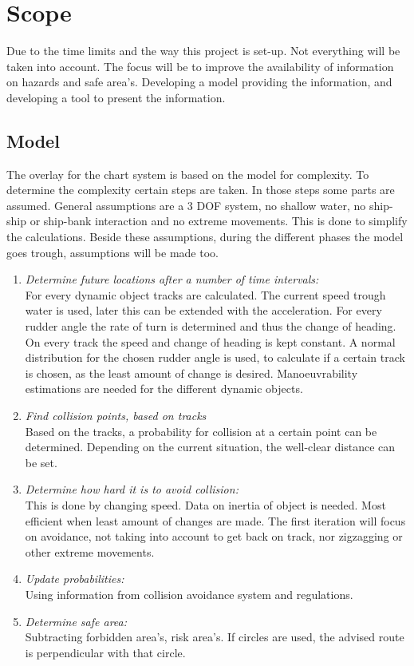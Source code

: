 
\section{Scope}
Due to the time limits and the way this project is set-up. Not everything will be taken into account. The focus will be to improve the availability of information on hazards and safe area's. Developing a model providing the information, and developing a tool to present the information. 

\subsection{Model}
The overlay for the chart system is based on the model for complexity. To determine the complexity certain steps are taken. In those steps some parts are assumed. General assumptions are a 3 \ac{DOF} system, no shallow water, no ship-ship or ship-bank interaction and no extreme movements. This is done to simplify the calculations. Beside these assumptions, during the different phases the model goes trough, assumptions will be made too. 
\begin{enumerate}
	\item \emph{Determine future locations after a number of time intervals:}\\
	For every dynamic object tracks are calculated. The current speed trough water is used, later this can be extended with the acceleration. For every rudder angle the rate of turn is determined and thus the change of heading. On every track the speed and change of heading is kept constant. A normal distribution for the chosen rudder angle is used, to calculate if a certain track is chosen, as the least amount of change is desired. Manoeuvrability estimations are needed for the different dynamic objects.
	\item \emph{Find collision points, based on tracks}\\
	Based on the tracks, a probability for collision at a certain point can be determined. Depending on the current situation, the well-clear distance can be set.
	\item \emph{Determine how hard it is to avoid collision:}\\
	This is done by changing speed. Data on inertia of object is needed. Most efficient when least amount of changes are made. The first iteration will focus on avoidance, not taking into account to get back on track, nor zigzagging or other extreme movements.
	\item \emph{Update probabilities:}\\
	Using information from collision avoidance system and regulations. 
	\item \emph{Determine safe area:}\\
	Subtracting forbidden area's, risk area's. If circles are used, the advised route is perpendicular with that circle. 	
\end{enumerate}

